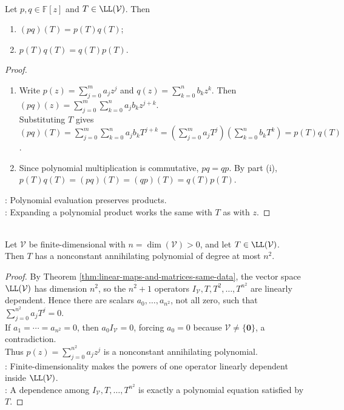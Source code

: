 \begin{proposition} \label{prop:operator-polynomial-products} \\
Let $p,q\in\mathbb{F}[z]$ and $T\in\LL(\mathcal{V})$. Then
\begin{enumerate}[label=(\roman*)]
\setlength{\itemsep}{0pt}
\item $(pq)(T)=p(T)q(T)$;
\item $p(T)q(T)=q(T)p(T)$.
\end{enumerate}
\begin{proof}
\begin{enumerate}[label=(\roman*)]
\setlength{\itemsep}{0pt}
\item Write $p(z)=\sum_{j=0}^{m}a_jz^j$ and $q(z)=\sum_{k=0}^{n}b_kz^k$. Then $(pq)(z)=\sum\limits_{j=0}^{m}\sum\limits_{k=0}^{n}a_jb_kz^{j+k}$.\\
Substituting $T$ gives $(pq)(T)=\sum\limits_{j=0}^{m}\sum\limits_{k=0}^{n}a_jb_kT^{j+k} =\left(\sum\limits_{j=0}^{m}a_jT^j\right)\left(\sum\limits_{k=0}^{n}b_kT^k\right) =p(T)q(T)$.
\item Since polynomial multiplication is commutative, $pq=qp$. By part (i), $p(T)q(T)=(pq)(T)=(qp)(T)=q(T)p(T)$.
\end{enumerate}
: Polynomial evaluation preserves products.\\
: Expanding a polynomial product works the same with $T$ as with $z$.
\end{proof}
\end{proposition}

\begin{proposition} \label{prop:finite-dimensional-operators-have-annihilating-polynomials} \\
Let $\mathcal{V}$ be finite-dimensional with $n=\dim(\mathcal{V})>0$, and let $T\in\LL(\mathcal{V})$.\\
Then $T$ has a nonconstant annihilating polynomial of degree at most $n^2$.
\begin{proof}
By Theorem \ref{thm:linear-maps-and-matrices-same-data}, the vector space $\LL(\mathcal{V})$ has dimension $n^2$, so the $n^2+1$ operators $I_{\mathcal{V}},T,T^2,\ldots,T^{n^2}$ are linearly dependent. Hence there are scalars $a_0,\ldots,a_{n^2}$, not all zero, such that $\sum\limits_{j=0}^{n^2}a_jT^j=0$.\\
If $a_1=\cdots=a_{n^2}=0$, then $a_0I_{\mathcal{V}}=0$, forcing $a_0=0$ because $\mathcal{V}\neq\{\mathbf{0}\}$, a contradiction.\\
Thus $p(z)=\sum\limits_{j=0}^{n^2}a_jz^j$ is a nonconstant annihilating polynomial.\\
: Finite-dimensionality makes the powers of one operator linearly dependent inside $\LL(\mathcal{V})$.\\
: A dependence among $I_{\mathcal{V}},T,\ldots,T^{n^2}$ is exactly a polynomial equation satisfied by $T$.
\end{proof}
\end{proposition}

